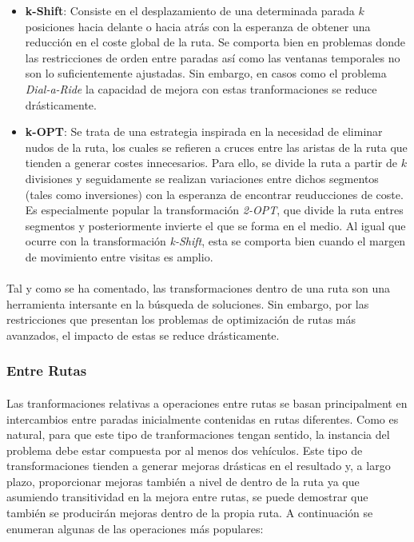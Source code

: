 \documentclass{subfiles}
\begin{document}
          \begin{itemize}

            \item \textbf{k-Shift}: Consiste en el desplazamiento de una determinada parada $k$ posiciones hacia delante o hacia atrás con la esperanza de obtener una reducción en el coste global de la ruta. Se comporta bien en problemas donde las restricciones de orden entre paradas así como las ventanas temporales no son lo suficientemente ajustadas. Sin embargo, en casos como el problema \emph{Dial-a-Ride} la capacidad de mejora con estas tranformaciones se reduce drásticamente.

            \item \textbf{k-OPT}: Se trata de una estrategia inspirada en la necesidad de eliminar nudos de la ruta, los cuales se refieren a cruces entre las aristas de la ruta que tienden a generar costes innecesarios. Para ello, se divide la ruta a partir de $k$ divisiones y seguidamente se realizan variaciones entre dichos segmentos (tales como inversiones) con la esperanza de encontrar reuducciones de coste. Es especialmente popular la transformación \emph{2-OPT}, que divide la ruta entres segmentos y posteriormente invierte el que se forma en el medio. Al igual que ocurre con la transformación \emph{k-Shift}, esta se comporta bien cuando el margen de movimiento entre visitas es amplio.

          \end{itemize}

          \paragraph{}
          Tal y como se ha comentado, las transformaciones dentro de una ruta son una herramienta intersante en la búsqueda de soluciones. Sin embargo, por las restricciones que presentan los problemas de optimización de rutas más avanzados, el impacto de estas se reduce drásticamente.

        \subsubsection{Entre Rutas}
        \label{sec:solving_local_search_outer}

          \paragraph{}
          Las tranformaciones relativas a operaciones entre rutas se basan principalment en intercambios entre paradas inicialmente contenidas en rutas diferentes. Como es natural, para que este tipo de tranformaciones tengan sentido, la instancia del problema debe estar compuesta por al menos dos vehículos. Este tipo de transformaciones tienden a generar mejoras drásticas en el resultado y, a largo plazo, proporcionar mejoras también a nivel de dentro de la ruta ya que asumiendo transitividad en la mejora entre rutas, se puede demostrar que también se producirán mejoras dentro de la propia ruta. A continuación se enumeran algunas de las operaciones más populares:
\end{document}
